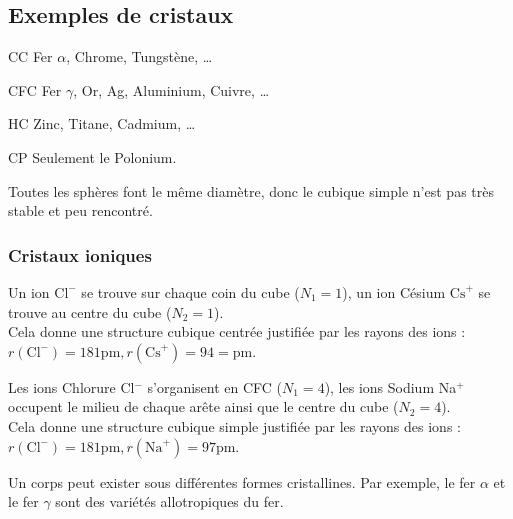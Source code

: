 \subsection*{Exemples de cristaux}
\begin{ex}
    \begin{compactdesc}
        \item[CC] Fer $\alpha$, Chrome, Tungstène, \dots
        \item[CFC] Fer $\gamma$, Or, Ag, Aluminium, Cuivre, \dots
        \item[HC] Zinc, Titane, Cadmium, \dots
        \item[CP] Seulement le Polonium.
    \end{compactdesc}
\end{ex}
\begin{rem}
    Toutes les sphères font le même diamètre, donc le cubique simple n'est pas
    très stable et peu rencontré.
\end{rem}

\subsubsection*{Cristaux ioniques}
\begin{ex}
    Un ion $\text{Cl}^-$ se trouve sur chaque coin du cube ($N_1 = 1$), un ion
    Césium $\text{Cs}^+$ se trouve au centre du cube ($N_2 = 1$).\\
    Cela donne une structure cubique centrée justifiée par les rayons des ions
    : $r(\text{Cl}^-) = 181\text{pm}, r(\text{Cs}^+) = 94 =\text{pm}$.
\end{ex}
\begin{ex}
    Les ions Chlorure Cl$^-$ s'organisent en CFC ($N_1 = 4$), les ions Sodium
    Na$^+$ occupent le milieu de chaque arête ainsi que le centre du cube
    ($N_2 = 4$).\\
    Cela donne une structure cubique simple justifiée par les rayons des
    ions :
    $r(\text{Cl}^-) = 181\text{pm}, r(\text{Na}^+) = 97\text{pm}$.
\end{ex}

\begin{rem}
    Un corps peut exister sous différentes formes cristallines. Par exemple,
    le fer $\alpha$ et le fer $\gamma$ sont des variétés allotropiques du
    fer.
\end{rem}


